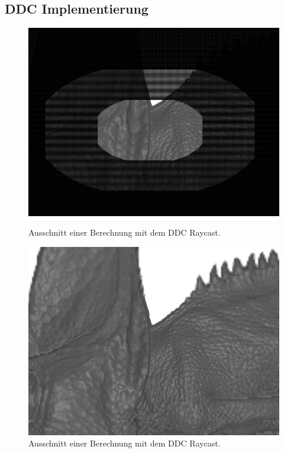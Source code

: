\subsection{DDC Implementierung}
\begin{figure}[]
	\centering
	\begin{minipage}[t]{0.49\textwidth}
		\centering
		\includegraphics[width=1\textwidth]{../../Grafiken/results/implementierung/ddc_o_ip.png}
		\caption{Ausschnitt einer Berechnung mit dem DDC Raycast.}
		\label{fig::imp::ddc_o_ip}
	\end{minipage}
	\hfill
	\begin{minipage}[t]{0.49\textwidth}
		\centering
		\includegraphics[width=1\textwidth]{../../Grafiken/results/implementierung/ddc_m_ip.png}
		\caption{Ausschnitt einer Berechnung mit dem DDC Raycast.}
		\label{fig::imp::ddc_m_ip}
	\end{minipage}
\end{figure}
